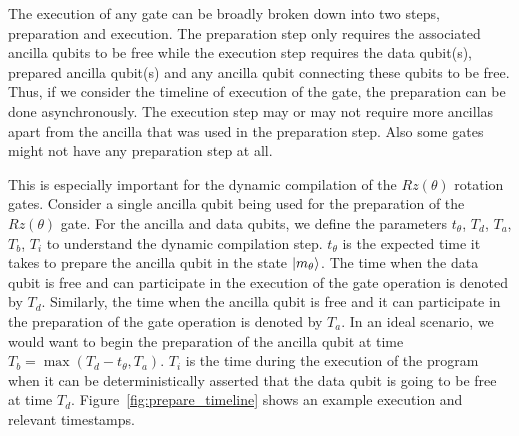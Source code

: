 The execution of any gate can be broadly broken down into two steps, preparation and execution. The preparation step only requires the associated ancilla qubits to be free while the execution step requires the data qubit(s), prepared ancilla qubit(s) and any ancilla qubit connecting these qubits to be free. Thus, if we consider the timeline of execution of the gate, the preparation can be done asynchronously. The execution step may or may not require more ancillas apart from the ancilla that was used in the preparation step. Also some gates might not have any preparation step at all.\par
This is especially important for the dynamic compilation of the $Rz(\theta)$ rotation gates. Consider a single ancilla qubit being used for the preparation of the $Rz(\theta)$ gate. For the ancilla and data qubits, we define the parameters $t_\theta$, $T_d$, $T_a$, $T_b$, $T_i$ to understand the dynamic compilation step. $t_\theta$ is the expected time it takes to prepare the ancilla qubit in the state $\ket{m_\theta}$. The time when the data qubit is free and can participate in the execution of the gate operation is denoted by $T_d$. Similarly, the time when the ancilla qubit is free and it can participate in the preparation of the gate operation is denoted by $T_a$. In an ideal scenario, we would want to begin the preparation of the ancilla qubit at time $T_b = \max\left(T_d - t_\theta, T_a\right)$. $T_i$ is the time during the execution of the program when it can be deterministically asserted that the data qubit is going to be free at time $T_d$. %
Figure~\ref{fig:prepare_timeline} shows an example execution and relevant timestamps.\par

